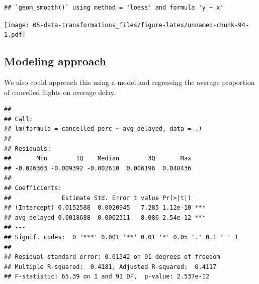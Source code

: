 \documentclass[]{book}
\newenvironment{Shaded}{\begin{snugshade}}{\end{snugshade}}
\newcommand{\DataTypeTok}[1]{\textcolor[rgb]{0.13,0.29,0.53}{#1}}
\newcommand{\KeywordTok}[1]{\textcolor[rgb]{0.13,0.29,0.53}{\textbf{#1}}}
\newcommand{\NormalTok}[1]{#1}
\newcommand{\OperatorTok}[1]{\textcolor[rgb]{0.81,0.36,0.00}{\textbf{#1}}}
\newcommand{\OtherTok}[1]{\textcolor[rgb]{0.56,0.35,0.01}{#1}}
\newcommand{\StringTok}[1]{\textcolor[rgb]{0.31,0.60,0.02}{#1}}
\theoremstyle{definition}
\theoremstyle{definition}
\theoremstyle{definition}
\theoremstyle{remark}
\begin{document}
\begin{verbatim}
## `geom_smooth()` using method = 'loess' and formula 'y ~ x'
\end{verbatim}

\texttt{[image: 05-data-transformations\_files/figure-latex/unnamed-chunk-94-1.pdf]}

\hypertarget{modeling-approach}{%
\subsection{Modeling approach}\label{modeling-approach}}

We also could approach this using a model and regressing the average
proportion of cancelled flights on average delay.

\begin{Shaded}
\end{Shaded}

\begin{verbatim}
## 
## Call:
## lm(formula = cancelled_perc ~ avg_delayed, data = .)
## 
## Residuals:
##       Min        1Q    Median        3Q       Max 
## -0.026363 -0.009392 -0.002610  0.006196  0.048436 
## 
## Coefficients:
##              Estimate Std. Error t value Pr(>|t|)    
## (Intercept) 0.0152588  0.0020945   7.285 1.12e-10 ***
## avg_delayed 0.0018688  0.0002311   8.086 2.54e-12 ***
## ---
## Signif. codes:  0 '***' 0.001 '**' 0.01 '*' 0.05 '.' 0.1 ' ' 1
## 
## Residual standard error: 0.01342 on 91 degrees of freedom
## Multiple R-squared:  0.4181, Adjusted R-squared:  0.4117 
## F-statistic: 65.39 on 1 and 91 DF,  p-value: 2.537e-12
\end{verbatim}
\end{document}
